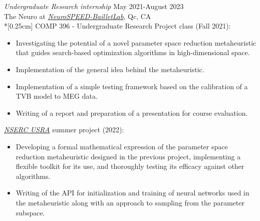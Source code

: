 \documentclass[margin, 10pt]{res} %
\begin{document}
\begin{resume}
		{\sl Undergraduate Research internship} \hfill May 2021-August 2023\\The Neuro at \href{https://www.neurospeed-bailletlab.org/}{\textit{NeuroSPEED-BailletLab}}, Qc, CA\\*[0.25cm] 
		COMP 396 - Undergraduate Research Project class (Fall 2021):
		\vspace*{0.15cm}
		\begin{itemize} \itemsep -2pt %
			\item[\ding{227}] Investigating the potential of a novel parameter space reduction metaheuristic that guides search-based optimization algorithms in high-dimensional space.
			\item Implementation of the general idea behind the metaheuristic.
			\item Implementation of a simple testing framework based on the calibration of a TVB model to MEG data.
			\item Writing of a report and preparation of a presentation for course evaluation.
		\end{itemize}
		\vspace{-0.10cm}
		\href{https://www.nserc-crsng.gc.ca/students-etudiants/ug-pc/usra-brpc_eng.asp}{\textit{NSERC USRA}} summer project (2022):
		\vspace*{0.15cm}
		\begin{itemize} \itemsep -2pt %
			\item[\ding{227}] Developing a formal mathematical expression of the parameter space reduction metaheuristic designed in the previous project, implementing a flexible toolkit for its use, and thoroughly testing its efficacy against other algorithms.
			\item Writing of the API for initialization and training of neural networks used in the metaheuristic along with an approach to sampling from the parameter subspace.

\end{itemize}
\end{resume}
\end{document}
